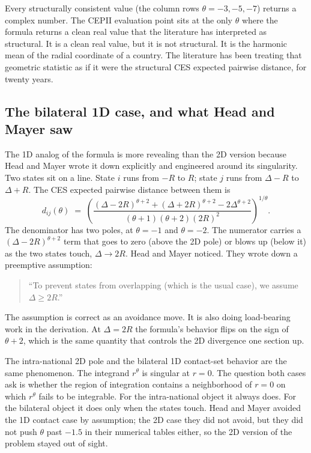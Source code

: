 \documentclass[11pt, letterpaper]{article}
\theoremstyle{definition}
\newcommand{\dij}{d_{ij}}
\begin{document}
Every structurally consistent value (the column rows $\theta = -3, -5, -7$)
returns a complex number. The CEPII evaluation point sits at the only
$\theta$ where the formula returns a clean real value that the
literature has interpreted as structural. It is a clean real value,
but it is not structural. It is the harmonic mean of the radial
coordinate of a country. The literature has been treating that
geometric statistic as if it were the structural CES expected
pairwise distance, for twenty years.

\subsection{The bilateral 1D case, and what Head and Mayer saw}
\label{sec:bilateral-contact}

The 1D analog of the formula is more revealing than the 2D version
because Head and Mayer wrote it down explicitly and engineered around
its singularity. Two states sit on a line. State $i$ runs from $-R$
to $R$; state $j$ runs from $\Delta - R$ to $\Delta + R$. The CES
expected pairwise distance between them is
\begin{equation}
\dij(\theta) \;=\; \left( \frac{(\Delta - 2R)^{\theta+2} + (\Delta + 2R)^{\theta+2} - 2\Delta^{\theta+2}}{(\theta+1)(\theta+2)(2R)^2} \right)^{1/\theta}.
\end{equation}
The denominator has two poles, at $\theta = -1$ and $\theta = -2$.
The numerator carries a $(\Delta - 2R)^{\theta+2}$ term that goes to
zero (above the 2D pole) or blows up (below it) as the two states
touch, $\Delta \to 2R$. Head and Mayer noticed. They wrote down a
preemptive assumption:
\begin{quote}
``To prevent states from overlapping (which is the usual case), we
assume $\Delta \geq 2R$.''
\end{quote}
The assumption is correct as an avoidance move. It is also doing
load-bearing work in the derivation. At $\Delta = 2R$ the formula's
behavior flips on the sign of $\theta + 2$, which is the same
quantity that controls the 2D divergence one section up.

The intra-national 2D pole and the bilateral 1D contact-set behavior
are the same phenomenon. The integrand $r^\theta$ is singular at
$r = 0$. The question both cases ask is whether the region of
integration contains a neighborhood of $r = 0$ on which $r^\theta$
fails to be integrable. For the intra-national object it always
does. For the bilateral object it does only when the states touch.
Head and Mayer avoided the 1D contact case by assumption; the 2D
case they did not avoid, but they did not push $\theta$ past
$-1.5$ in their numerical tables either, so the 2D version of the
problem stayed out of sight.
\end{document}
